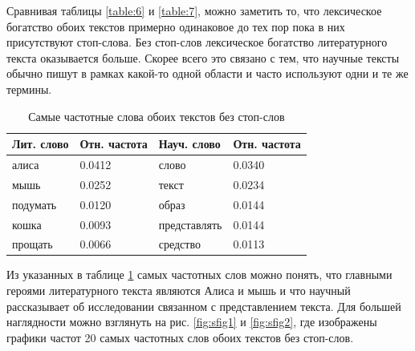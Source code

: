 \documentclass[12pt]{article}
\begin{document}
Сравнивая таблицы \ref{table:6} и \ref{table:7}, можно заметить то, что лексическое богатство обоих текстов примерно одинаковое до тех пор пока в них присутствуют стоп-слова. Без стоп-слов лексическое богатство литературного текста оказывается больше. Скорее всего это связано с тем, что научные тексты обычно пишут в рамках какой-то одной области и часто используют одни и те же термины.

\begin{table}[h!]
\centering
\begin{tabular}{ |p{3cm}||p{3cm}||p{3cm}|p{3cm}| }
 \hline
 Лит. слово& Отн. частота & Науч. слово & Отн. частота\\
 \hline
 алиса & 0.0412 & слово & 0.0340 \\
 мышь & 0.0252 & текст & 0.0234 \\
 подумать & 0.0120 & образ & 0.0144 \\
 кошка & 0.0093 & представлять & 0.0144\\
 прощать & 0.0066 & средство & 0.0113 \\
 \hline
\end{tabular}
\caption{Самые частотные слова обоих текстов без стоп-слов}
\label{table:8}
\end{table}

Из указанных в таблице \ref{table:8} самых частотных слов можно понять, что главными героями литературного текста являются Алиса и мышь и что научный рассказывает об исследовании связанном с представлением текста. Для большей наглядности можно взглянуть на рис. \ref{fig:sfig1} и \ref{fig:sfig2}, где изображены графики частот 20 самых частотных слов обоих текстов без стоп-слов.
\end{document}
